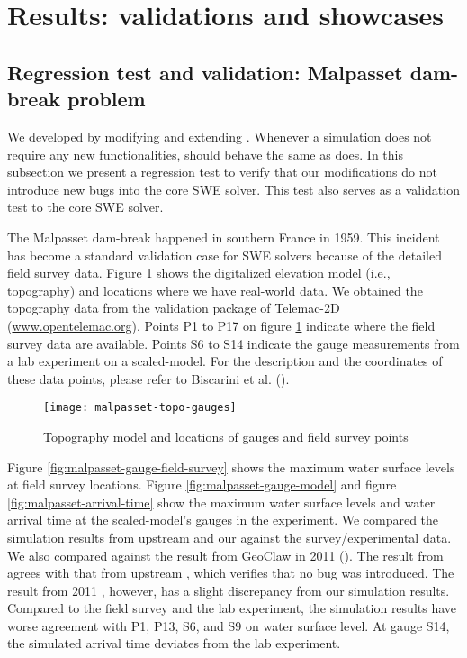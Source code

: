 \section{Results: validations and showcases}

\subsection{Regression test and validation: Malpasset dam-break problem}

We developed \geoclawlandspill{} by modifying and extending \geoclaw{}.
Whenever a simulation does not require any new functionalities, \geoclawlandspill{} should behave the same as \geoclaw{} does.
In this subsection we present a regression test to verify that our modifications do not introduce new bugs into the core SWE solver.
This test also serves as a validation test to the core SWE solver.

The Malpasset dam-break happened in southern France in 1959.
This incident has become a standard validation case for SWE solvers because of the detailed field survey data.
Figure \ref{fig:malpasset-topo-gauges} shows the digitalized elevation model (i.e., topography) and locations where we have real-world data.
We obtained the topography data from the validation package of Telemac-2D (\url{www.opentelemac.org}).
Points P1 to P17 on figure \ref{fig:malpasset-topo-gauges} indicate where the field survey data are available.
Points S6 to S14 indicate the gauge measurements from a lab experiment on a scaled-model.
For the description and the coordinates of these data points, please refer to Biscarini et al. (\cite{biscarini_simulation_2016}).

\begin{figure}
    \centering
    \texttt{[image: malpasset-topo-gauges]}
    \caption{Topography model and locations of gauges and field survey points}\label{fig:malpasset-topo-gauges}
\end{figure}

Figure \ref{fig:malpasset-gauge-field-survey} shows the maximum water surface levels at field survey locations.
Figure \ref{fig:malpasset-gauge-model} and figure \ref{fig:malpasset-arrival-time} show the maximum water surface levels and water arrival time at the scaled-model's gauges in the experiment.
We compared the simulation results from upstream \geoclaw{} and our \geoclawlandspill{} against the survey/experimental data.
We also compared against the result from GeoClaw in 2011 (\cite{George2011}).
The result from \geoclawlandspill{} agrees with that from upstream \geoclaw{}, which verifies that no bug was introduced.
The result from 2011 \geoclaw{}, however, has a slight discrepancy from our simulation results.
Compared to the field survey and the lab experiment, the simulation results have worse agreement with P1, P13, S6, and S9 on water surface level.
At gauge S14, the simulated arrival time deviates from the lab experiment.

